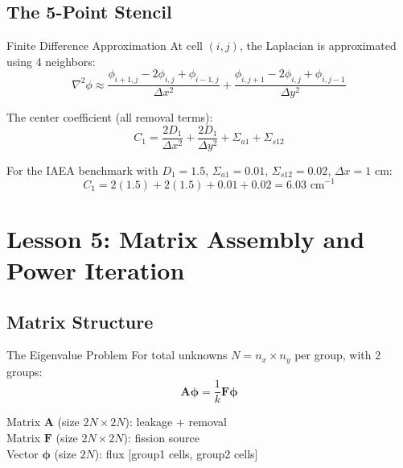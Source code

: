 \documentclass[12pt,a4paper]{article}
\begin{document}
\subsection{The 5-Point Stencil}

\begin{physicsbox}{Finite Difference Approximation}
At cell $(i,j)$, the Laplacian is approximated using 4 neighbors:
\begin{equation}
\nabla^2\phi \approx
\frac{\phi_{i+1,j} - 2\phi_{i,j} + \phi_{i-1,j}}{\Delta x^2}
+ \frac{\phi_{i,j+1} - 2\phi_{i,j} + \phi_{i,j-1}}{\Delta y^2}
\end{equation}

The center coefficient (all removal terms):
\begin{equation}
C_1 = \frac{2D_1}{\Delta x^2} + \frac{2D_1}{\Delta y^2} + \Sigma_{a1} + \Sigma_{s12}
\end{equation}

For the IAEA benchmark with $D_1=1.5$, $\Sigma_{a1}=0.01$,
$\Sigma_{s12}=0.02$, $\Delta x=1$ cm:
\begin{equation}
C_1 = 2(1.5) + 2(1.5) + 0.01 + 0.02 = 6.03 \text{ cm}^{-1}
\end{equation}
\end{physicsbox}

\section{Lesson 5: Matrix Assembly and Power Iteration}

\subsection{Matrix Structure}

\begin{physicsbox}{The Eigenvalue Problem}
For total unknowns $N = n_x \times n_y$ per group, with 2 groups:
\begin{equation}
\mathbf{A}\boldsymbol{\phi} = \frac{1}{k}\mathbf{F}\boldsymbol{\phi}
\end{equation}

Matrix $\mathbf{A}$ (size $2N \times 2N$): leakage + removal\\
Matrix $\mathbf{F}$ (size $2N \times 2N$): fission source\\
Vector $\boldsymbol{\phi}$ (size $2N$): flux [group1 cells, group2 cells]
\end{physicsbox}
\end{document}
